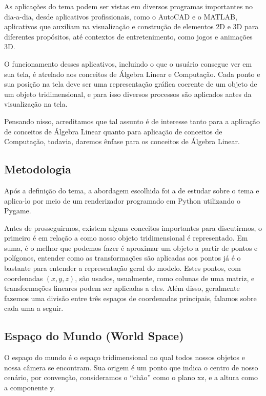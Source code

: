\documentclass[12pt]{article}
\begin{document}
As aplicações do tema podem ser vistas em diversos programas importantes no dia-a-dia, desde aplicativos profissionais, como o AutoCAD e o MATLAB, aplicativos que auxiliam na visualização e construção de elementos 2D e 3D para diferentes propósitos, até contextos de entretenimento, como jogos e animações 3D.

O funcionamento desses aplicativos, incluindo o que o usuário consegue ver em sua tela, é atrelado aos conceitos de Álgebra Linear e Computação. Cada ponto e sua posição na tela deve ser uma representação gráfica coerente de um objeto de um objeto tridimensional, e para isso diversos processos são aplicados antes da visualização na tela.

Pensando nisso, acreditamos que tal assunto é de interesse tanto para a aplicação de conceitos de Álgebra Linear quanto para aplicação de conceitos de Computação, todavia, daremos ênfase para os conceitos de Álgebra Linear.

\subsection{Metodologia}

Após a definição do tema, a abordagem escolhida foi a de estudar sobre o tema e aplica-lo por meio de um renderizador programado em Python utilizando o Pygame.

Antes de prosseguirmos, existem alguns conceitos importantes para discutirmos, o primeiro é em relação a como nosso objeto tridimensional é representado. Em suma, é o melhor que podemos fazer é aproximar um objeto a partir de pontos e polígonos, entender como as transformações são aplicadas aos pontos já é o bastante para entender a representação geral do modelo. Estes pontos, com coordenadas $(x,y,z)$, são usados, usualmente, como colunas de uma matriz, e transformações lineares podem ser aplicadas a eles. Além disso, geralmente fazemos uma divisão entre três espaços de coordenadas principais, falamos sobre cada uma a seguir.

\subsection{Espaço do Mundo (World Space)}

O espaço do mundo é o espaço tridimensional no qual todos nossos objetos e nossa câmera se encontram. Sua origem é um ponto que indica o centro de nosso cenário, por convenção, consideramos o ``chão'' como o plano xz, e a altura como a componente y. 
\end{document}
